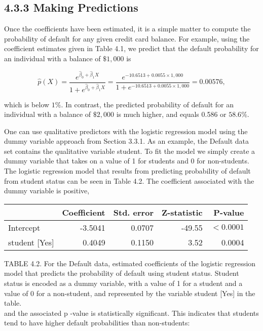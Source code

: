 \documentclass[10pt]{article}
\begin{document}
\subsection*{4.3.3 Making Predictions}
Once the coefficients have been estimated, it is a simple matter to compute the probability of default for any given credit card balance. For example, using the coefficient estimates given in Table 4.1, we predict that the default probability for an individual with a balance of $\$ 1,000$ is

$$
\hat{p}(X)=\frac{e^{\hat{\beta}_{0}+\hat{\beta}_{1} X}}{1+e^{\hat{\beta}_{0}+\hat{\beta}_{1} X}}=\frac{e^{-10.6513+0.0055 \times 1,000}}{1+e^{-10.6513+0.0055 \times 1,000}}=0.00576,
$$

which is below $1 \%$. In contrast, the predicted probability of default for an individual with a balance of $\$ 2,000$ is much higher, and equals 0.586 or $58.6 \%$.

One can use qualitative predictors with the logistic regression model using the dummy variable approach from Section 3.3.1. As an example, the Default data set contains the qualitative variable student. To fit the model we simply create a dummy variable that takes on a value of 1 for students and 0 for non-students. The logistic regression model that results from predicting probability of default from student status can be seen in Table 4.2. The coefficient associated with the dummy variable is positive,


\begin{center}
\begin{tabular}{lrrrr}
\hline
 & Coefficient & Std. error & Z-statistic & P-value \\
\hline
Intercept & -3.5041 & 0.0707 & -49.55 & $<0.0001$ \\
student [Yes] & 0.4049 & 0.1150 & 3.52 & 0.0004 \\
\hline
\end{tabular}
\end{center}

TABLE 4.2. For the Default data, estimated coefficients of the logistic regression model that predicts the probability of default using student status. Student status is encoded as a dummy variable, with a value of 1 for a student and a value of 0 for a non-student, and represented by the variable student [Yes] in the table.\\
and the associated p -value is statistically significant. This indicates that students tend to have higher default probabilities than non-students:
\end{document}
